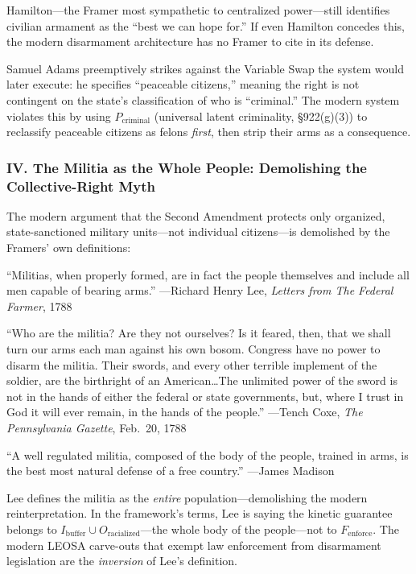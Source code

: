 \documentclass[12pt,openany]{book}
\begin{document}
Hamilton---the Framer most sympathetic to centralized power---still identifies civilian armament as the ``best we can hope for.'' If even Hamilton concedes this, the modern disarmament architecture has no Framer to cite in its defense.

Samuel Adams preemptively strikes against the Variable Swap the system would later execute: he specifies ``peaceable citizens,'' meaning the right is not contingent on the state's classification of who is ``criminal.'' The modern system violates this by using $P_{\text{criminal}}$ (universal latent criminality, \S922(g)(3)) to reclassify peaceable citizens as felons \textit{first}, then strip their arms as a consequence.

\subsubsection*{IV. The Militia as the Whole People: Demolishing the Collective-Right Myth}

The modern argument that the Second Amendment protects only organized, state-sanctioned military units---not individual citizens---is demolished by the Framers' own definitions:

\begin{historicalsource}
``Militias, when properly formed, are in fact the people themselves and include all men capable of bearing arms.'' \hfill ---Richard Henry Lee, \textit{Letters from The Federal Farmer}, 1788

\medskip
``Who are the militia? Are they not ourselves? Is it feared, then, that we shall turn our arms each man against his own bosom. Congress have no power to disarm the militia. Their swords, and every other terrible implement of the soldier, are the birthright of an American\ldots The unlimited power of the sword is not in the hands of either the federal or state governments, but, where I trust in God it will ever remain, in the hands of the people.'' \hfill ---Tench Coxe, \textit{The Pennsylvania Gazette}, Feb.\ 20, 1788

\medskip
``A well regulated militia, composed of the body of the people, trained in arms, is the best most natural defense of a free country.'' \hfill ---James Madison
\end{historicalsource}

Lee defines the militia as the \textit{entire} population---demolishing the modern reinterpretation. In the framework's terms, Lee is saying the kinetic guarantee belongs to $I_{\text{buffer}} \cup O_{\text{racialized}}$---the whole body of the people---not to $F_{\text{enforce}}$. The modern LEOSA carve-outs that exempt law enforcement from disarmament legislation are the \textit{inversion} of Lee's definition.
\end{document}
